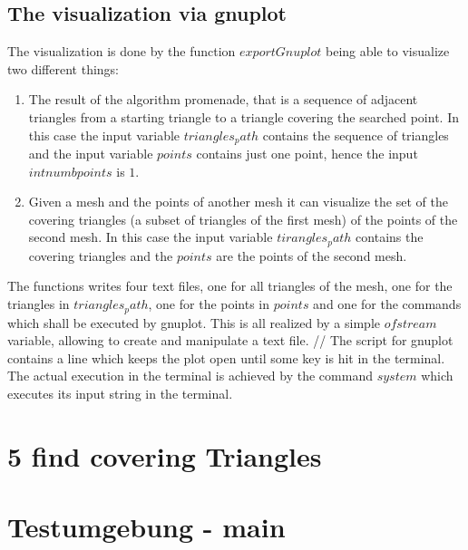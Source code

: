 \documentclass[10pt]{article}
\begin{document}
\subsection{The visualization via gnuplot}
	The visualization is done by the function $ exportGnuplot $ being able to visualize two different things: 
	\begin{enumerate}
		\item 
		The result of the algorithm promenade, that is a sequence of adjacent triangles from a starting triangle to a triangle covering the searched point. 
		In this case the input variable $ triangles_path $ contains the sequence of triangles and the input variable $  points $ contains just one point, hence the input $ int numbpoints $ is $ 1 $. 
		\item 
		Given a mesh and the points of another mesh it can visualize the set of the covering triangles (a subset of triangles of the first mesh) of the points of the second mesh. 
		In this case the input variable $ tirangles_path $ contains the covering triangles and the $ points $ are the points of the second mesh. 
	\end{enumerate}
The functions writes four text files, one for all triangles of the mesh, one for the triangles in $ triangles_path $, one for the points in $ points $ and one for the commands which shall be executed by gnuplot. This is all realized by a simple $ ofstream $ variable, allowing to create and manipulate a text file. //
The script for gnuplot contains a line which keeps the plot open until some key is hit in the terminal. 
The actual execution in the terminal is achieved by the command $ system $ which executes its input string in the terminal. 

\section{5 find covering Triangles}

\section{Testumgebung - main}
\end{document}
